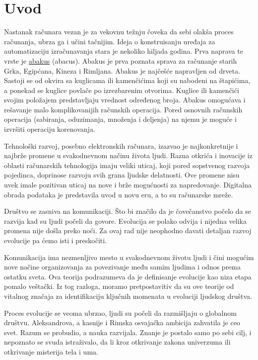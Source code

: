 \documentclass[10pt]{article}
\begin{document}
	
	\tableofcontents
	
	\pagebreak
	
	\section{Uvod}
	
	Nastanak računara vezan je za vekovnu težnju čoveka da sebi olakša proces računanja, ubrza ga i učini tačnijim. Ideja o konstruisanju uređaja za automatizaciju izračunavanja stara je nekoliko hiljada godina. Prva naprava te vrste je \href{https://sr.m.wikipedia.org/wiki/%D0%90%D0%B1%D0%B0%D0%BA%D1%83%D1%81_(%D1%80%D0%B0%D1%87%D1%83%D0%BD%D0%B0%D1%9A%D0%B5)}{abakus} (abacus). 
	Abakus je prva poznata sprava za računanje starih Grka, Egipćana, Kineza i Rimljana. Abakus je najčešće napravljen od drveta. Sastoji se od okvira sa kuglicama ili kamenčićima koji su nabodeni na štapićima, a ponekad se kuglice povlače po izrezbarenim otvorima. Kuglice ili kamenčići svojim položajem predstavljaju vrednost određenog broja. Abakus omogućava i rešavanje malo komplikovanijih računskih operacija. Pored osnovnih računskih operacija (sabiranja, oduzimanja, množenja i deljenja) na njemu je moguće i izvršiti operaciju korenovanja.
	
	Tehnološki razvoj, posebno elektronskih računara, izazvao je najkonkretnije i najbrže promene u svakodnevnom načinu života ljudi. Razna otkrića i inovacije iz oblasti računarskih tehnologija imaju veliki uticaj, koji pored sopstvenog razvoja pojedinca, doprinose razvoju svih grana ljudske delatnosti. Ove promene nisu uvek imale pozitivan uticaj na nove i brže mogućnosti za napredovanje. Digitalna obrada podataka je predstavila uvod u novu eru, a to su računarske mreže.
	
	Društvo se zasniva na komunikaciji. Što bi značilo da je čovečanstvo počelo da se razvija kad su ljudi počeli da govore. Evolucija se polako odvija i nijedna velika promena nije došla preko noći. Za ovaj rad nije neophodno davati detaljan razvoj evolucije pa ćemo isti i preskočiti. 
	
	Komunikacija ima nezmenljivo mesto u svakodnevnom životu ljudi i čini mogućim nove načine organizovanja za povezivanje među samim ljudima i odnos prema ostatku sveta. Ova teorija podrazumeva da je definisanje evolucije kao niza etapa pomalo veštački. Iz tog razloga, moramo pretpostavitiv da su ove teorije od vitalnog značaja za identifikaciju ključnih momenata u evoluciji ljudskog društva.
	
	Proces evolucije se veoma ubrzao, ljudi su počeli da razmišljaju o globalnom društvu.  Aleksandrova, a kasnije i Rimska osvajačka ambicija zahvatila je ceo svet. Razum se probudio, a nauka razvijala.  Znanje je postalo samo po sebi cilj, i nepoznato se svuda istraživalo, da li kroz otkrivanje zakona univerzuma ili otkrivanje misterija tela i uma.
    
\end{document}
